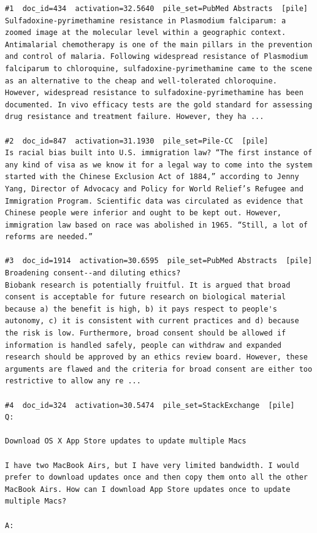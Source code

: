 \begin{verbatim}
#1  doc_id=434  activation=32.5640  pile_set=PubMed Abstracts  [pile]
Sulfadoxine-pyrimethamine resistance in Plasmodium falciparum: a zoomed image at the molecular level within a geographic context.
Antimalarial chemotherapy is one of the main pillars in the prevention and control of malaria. Following widespread resistance of Plasmodium falciparum to chloroquine, sulfadoxine-pyrimethamine came to the scene as an alternative to the cheap and well-tolerated chloroquine. However, widespread resistance to sulfadoxine-pyrimethamine has been documented. In vivo efficacy tests are the gold standard for assessing drug resistance and treatment failure. However, they ha ...

#2  doc_id=847  activation=31.1930  pile_set=Pile-CC  [pile]
Is racial bias built into U.S. immigration law? “The first instance of any kind of visa as we know it for a legal way to come into the system started with the Chinese Exclusion Act of 1884,” according to Jenny Yang, Director of Advocacy and Policy for World Relief’s Refugee and Immigration Program. Scientific data was circulated as evidence that Chinese people were inferior and ought to be kept out. However, immigration law based on race was abolished in 1965. “Still, a lot of reforms are needed.”

#3  doc_id=1914  activation=30.6595  pile_set=PubMed Abstracts  [pile]
Broadening consent--and diluting ethics?
Biobank research is potentially fruitful. It is argued that broad consent is acceptable for future research on biological material because a) the benefit is high, b) it pays respect to people's autonomy, c) it is consistent with current practices and d) because the risk is low. Furthermore, broad consent should be allowed if information is handled safely, people can withdraw and expanded research should be approved by an ethics review board. However, these arguments are flawed and the criteria for broad consent are either too restrictive to allow any re ...

#4  doc_id=324  activation=30.5474  pile_set=StackExchange  [pile]
Q:

Download OS X App Store updates to update multiple Macs

I have two MacBook Airs, but I have very limited bandwidth. I would prefer to download updates once and then copy them onto all the other MacBook Airs. How can I download App Store updates once to update multiple Macs?

A:


\end{verbatim}
